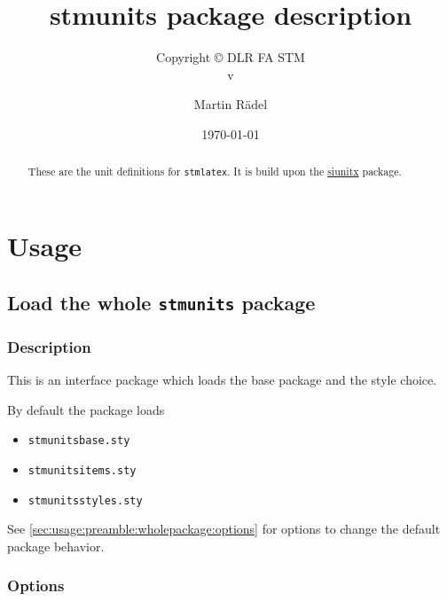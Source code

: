 \documentclass[%
  type=article,%
  layout=koma,%
  cleveref=true,%
  conditionallox=true,%
  conditionalloxnewpage=false,%
  date=true,%
  hyperref=true,%
  index=true,%
  listings=true,%
  math=true,%
]{stmtext}
\author{Martin R\"{a}del}
\title{stmunits package description}
\subtitle{Copyright \copyright{} \the\year{} DLR FA STM\\v\formatdate[versiondatestyle]{\DTMToday}}
\date{\today}
\begin{document}
\maketitle

\begin{abstract}
These are the unit definitions for \texttt{stmlatex}. It is build upon the \href{https://ctan.org/pkg/siunitx}{siunitx} package.
\end{abstract}

\tableofcontents

\conditionallistoffigures  %
\conditionallistoftables   %
\conditionallistoflistings %

\section{Usage}%

\subsection{Load the whole \protect\texttt{stmunits} package}
\label{sec:usage:preamble:wholepackage}

\subsubsection{Description}
\label{sec:usage:preamble:wholepackage:description}

This is an interface package which loads the base package and the style choice.

By default the package loads

\begin{itemize}[noitemsep]
  \item \verb+stmunitsbase.sty+
  \item \verb+stmunitsitems.sty+
  \item \verb+stmunitsstyles.sty+
\end{itemize}

See \autoref{sec:usage:preamble:wholepackage:options} for options to change the default package behavior.

\subsubsection{Options}
\label{sec:usage:preamble:wholepackage:options}
\end{document}
